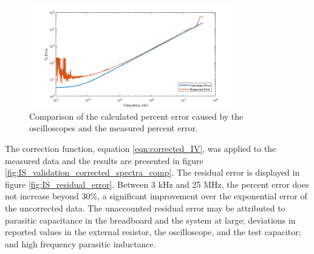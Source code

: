 \begin{figure}[H]
    \centering
    \includegraphics[width=0.8\textwidth]{images/percentError.png}
    \caption{Comparison of the calculated percent error caused by the oscilloscopes and the measured percent error.}
    \label{fig:test_circ_measurement_error}
\end{figure}

\par The correction function, equation \ref{eqn:corrected_IV}, was applied to the measured data and the results are presented in figure \ref{fig:IS_validation_corrected_spectra_comp}. The residual error is displayed in figure \ref{fig:IS_residual_error}. Between 3 kHz and 25 MHz, the percent error does not increase beyond 30\%, a significant improvement over the exponential error of the uncorrected data. The unaccounted residual error may be attributed to parasitic capacitance in the breadboard and the system at large; deviations in reported values in the external resistor, the oscilloscope, and the test capacitor; and high frequency parasitic inductance.

